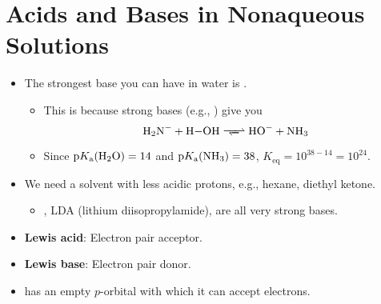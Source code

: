 \documentclass[../notes.tex]{subfiles}
\begin{document}
\section{Acids and Bases in Nonaqueous Solutions}
\begin{itemize}
    \item {}The strongest base you can have in water is .
    \begin{itemize}
        \item This is because strong bases (e.g., ) give you
        \begin{equation*}
            \ce{H2N- + H-OH <=>> HO- + NH3}
        \end{equation*}
        \item Since $\pKa(\ce{H2O})=14$ and $\pKa(\ce{NH3})=38$, $K_\text{eq}=10^{38-14}=10^{24}$.
    \end{itemize}
    \item We need a solvent with less acidic protons, e.g., hexane, diethyl ketone.
    \begin{itemize}
        \item {}, LDA (lithium diisopropylamide),  are all very strong bases.
    \end{itemize}
    \item \textbf{Lewis acid}: Electron pair acceptor.
    \item \textbf{Lewis base}: Electron pair donor.
    \item {} has an empty $p$-orbital with which it can accept electrons.
\end{itemize}
\end{document}
